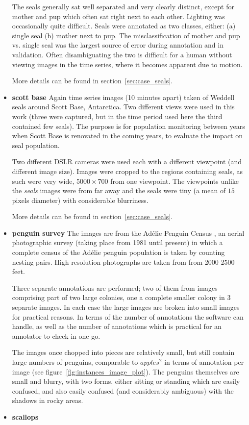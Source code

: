 \begin{itemize}
The seals generally sat well separated and very clearly distinct, except for mother and pup which often sat right next to each other. Lighting was occasionally quite difficult. Seals were annotated as two classes, either: (a) single seal (b) mother next to pup.  The misclassification of mother and pup vs. single seal was the largest source of error during annotation and in validation. Often disambiguating the two is difficult for a human without viewing images in the time series, where it becomes apparent due to motion.

More details can be found in section~\ref{sec:case_seals}.

    \item{\bf{scott base}}
Again time series images (10 minutes apart) taken of Weddell seals around Scott Base, Antarctica. Two different views were used in this work (three were captured, but in the time period used here the third contained few seals). The purpose is for population monitoring between years when Scott Base is renovated in the coming years, to evaluate the impact on seal population.

Two different DSLR cameras were used each with a different viewpoint (and different image size). Images were cropped to the regions containing seals, as such were very wide, $5000\times700$ from one viewpoint. The viewpoints unlike the \emph{seals} images were from far away and the seals were tiny (a mean of $15$ pixels diameter) with considerable blurriness.  
    
More details can be found in section~\ref{sec:case_seals}.
    
    \item{\bf{penguin survey}}
The images are from the Ad\'elie Penguin Census \cite{Lyver2014}, an aerial photographic survey (taking place from 1981 until present) in which a complete census of the Ad\'elie penguin population is taken by counting nesting pairs. High resolution photographs are taken from from 2000-2500 feet.

Three separate annotations are performed; two of them from images comprising part of two large colonies, one a complete smaller colony in 3 separate images. In each case the large images are broken into small images for practical reasons. In terms of the number of annotations the software can handle, as well as the number of annotations which is practical for an annotator to check in one go.
    
The images once chopped into pieces are relatively small, but still contain large numbers of penguins, comparable to $apples^2$ in terms of annotation per image (see figure~\ref{fig:instances_image_plot}). The penguins themselves are small and blurry, with two forms, either sitting or standing which are easily confused, and also easily confused (and considerably ambiguous) with the shadows in rocky areas.  
    \item{\bf{scallops}}
    

\end{itemize}
